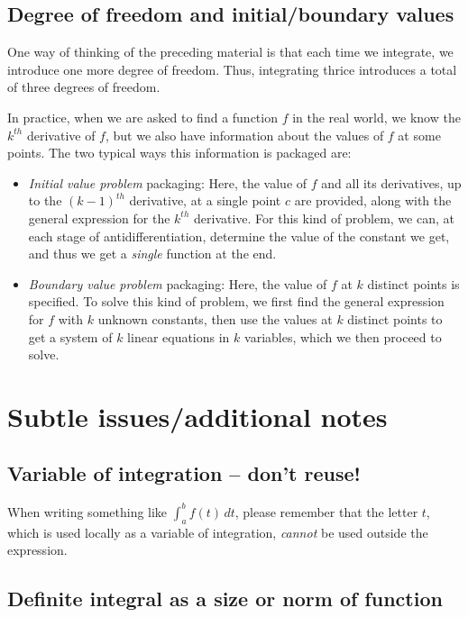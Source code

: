 \documentclass[10pt]{amsart}
\begin{document}
\subsection{Degree of freedom and initial/boundary values}

One way of thinking of the preceding material is that each time we
integrate, we introduce one more degree of freedom. Thus, integrating
thrice introduces a total of three degrees of freedom.

In practice, when we are asked to find a function $f$ in the real
world, we know the $k^{th}$ derivative of $f$, but we also have
information about the values of $f$ at some points. The two typical
ways this information is packaged are:

\begin{itemize}
\item {\em Initial value problem} packaging: Here, the value of $f$
  and all its derivatives, up to the $(k-1)^{th}$ derivative, at a
  single point $c$ are provided, along with the general expression for
  the $k^{th}$ derivative. For this kind of problem, we can, at each
  stage of antidifferentiation, determine the value of the constant we
  get, and thus we get a {\em single} function at the end.
\item {\em Boundary value problem} packaging: Here, the value of $f$
  at $k$ distinct points is specified. To solve this kind of problem,
  we first find the general expression for $f$ with $k$ unknown
  constants, then use the values at $k$ distinct points to get a
  system of $k$ linear equations in $k$ variables, which we then
  proceed to solve.
\end{itemize}

\section{Subtle issues/additional notes}

\subsection{Variable of integration -- don't reuse!}

When writing something like $\int_a^b f(t) \, dt$, please remember
that the letter $t$, which is used locally as a variable of
integration, {\em cannot} be used outside the expression.

\subsection{Definite integral as a size or norm of function}
\end{document}
